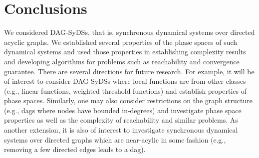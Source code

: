 \section{Conclusions}
\label{sec:concl}
 
We considered DAG-SyDSs, that is,
synchronous dynamical systems over directed acyclic graphs.
We established several properties of the phase spaces of
such dynamical systems and used those properties in establishing
complexity results and developing algorithms 
for problems such as reachability and convergence guarantee.
There are several directions for future research.
For example, it will be of interest to consider 
DAG-SyDSs where local functions are from other classes
(e.g., linear functions, weighted threshold functions)
and establish properties of phase spaces.
Similarly, one may also consider restrictions
on the graph structure (e.g., dags where nodes have
bounded in-degrees) and investigate phase space properties
as well as the complexity of reachability and similar problems.
As another extension, it is also of interest to investigate
synchronous dynamical systems over directed graphs which are
near-acylic in some fashion (e.g., removing a few directed
edges leads to a dag).


\iffalse
\noindent
\paragraph{Conclusions.}


\paragraph{Open Questions.}

\begin{itemize}
\item For DAG linear SyDSs, how long can a phase space cycle and transient be,
as a function of depth.

\item For bounded degree DAG  SyDSs, how long can a phase space cycle and transient be,
as a function of depth.

\item For various classes of Boolean functions of interest, 
how long can a phase space cycle and transient be?
(If they are polynomially bounded as a function of the number of nodes,
then reachability is polynomially solvable.)
\end{itemize}
\fi
